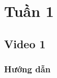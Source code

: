 \documentclass{article}
\begin{document}
\section{Tuần 1}



\subsection{Video 1}

\subsubsection{Hướng dẫn}





\end{document}
